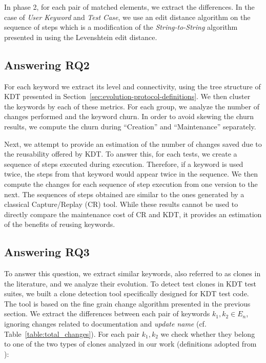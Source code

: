 In phase 2, for each pair of matched elements, we extract the differences. In the case of \emph{User Keyword} and \emph{Test Case}, we use an edit distance algorithm on the sequence of steps which is a modification of the \emph{String-to-String} algorithm presented in \cite{Ukkonen1985} using the Levenshtein edit distance.

\subsection{Answering RQ2}
\label{sec:evolution-protocol-rq2}

For each keyword we extract its level and connectivity, using the tree structure of KDT presented in Section~\ref{sec:evolution-protocol-definitions}. We then cluster the keywords by each of these metrics. For each group, we analyze the number of changes performed and the keyword churn. In order to avoid skewing the churn results, we compute the churn during ``Creation'' and ``Maintenance'' separately.

Next, we attempt to provide an estimation of the number of changes saved due to the reusability offered by KDT. To answer this, for each tests, we create a sequence of steps executed during execution. Therefore, if a keyword is used twice, the steps from that keyword would appear twice in the sequence. We then compute the changes for each sequence of step execution from one version to the next. The sequences of steps obtained are similar to the ones generated by a classical Capture/Replay (CR) tool. While these results cannot be used to directly compare the maintenance cost of CR and KDT, it provides an estimation of the benefits of reusing keywords.

\subsection{Answering RQ3}
\label{sec:evolution-protocol-rq3}

To answer this question, we extract similar keywords, also referred to as clones in the literature, and we analyze their evolution. To detect test clones in KDT test suites, we built a clone detection tool specifically designed for KDT test code. The tool is based on the fine grain change algorithm presented in the previous section. We extract the differences between each pair of keywords $k_1, k_2 \in E_n$, ignoring changes related to documentation and \emph{update name} (cf. Table~\ref{table:total_changes}).  For each pair $k_1, k_2$ we check whether they belong to one of the two types of clones analyzed in our work (definitions adopted from \cite{Lavoie2017}):

